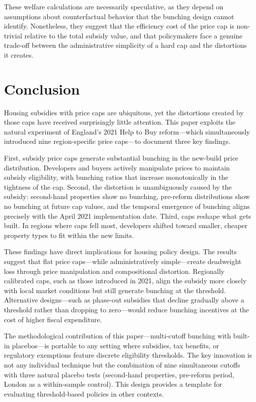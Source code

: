 \documentclass[12pt]{article}
\begin{document}
These welfare calculations are necessarily speculative, as they depend on assumptions about counterfactual behavior that the bunching design cannot identify. Nonetheless, they suggest that the efficiency cost of the price cap is non-trivial relative to the total subsidy value, and that policymakers face a genuine trade-off between the administrative simplicity of a hard cap and the distortions it creates.


\section{Conclusion}\label{sec:conclusion}

Housing subsidies with price caps are ubiquitous, yet the distortions created by those caps have received surprisingly little attention. This paper exploits the natural experiment of England's 2021 Help to Buy reform---which simultaneously introduced nine region-specific price caps---to document three key findings.

First, subsidy price caps generate substantial bunching in the new-build price distribution. Developers and buyers actively manipulate prices to maintain subsidy eligibility, with bunching ratios that increase monotonically in the tightness of the cap. Second, the distortion is unambiguously caused by the subsidy: second-hand properties show no bunching, pre-reform distributions show no bunching at future cap values, and the temporal emergence of bunching aligns precisely with the April 2021 implementation date. Third, caps reshape what gets built. In regions where caps fell most, developers shifted toward smaller, cheaper property types to fit within the new limits.

These findings have direct implications for housing policy design. The results suggest that flat price caps---while administratively simple---create deadweight loss through price manipulation and compositional distortion. Regionally calibrated caps, such as those introduced in 2021, align the subsidy more closely with local market conditions but still generate bunching at the threshold. Alternative designs---such as phase-out subsidies that decline gradually above a threshold rather than dropping to zero---would reduce bunching incentives at the cost of higher fiscal expenditure.

The methodological contribution of this paper---multi-cutoff bunching with built-in placebos---is portable to any setting where subsidies, tax benefits, or regulatory exemptions feature discrete eligibility thresholds. The key innovation is not any individual technique but the combination of nine simultaneous cutoffs with three natural placebo tests (second-hand properties, pre-reform period, London as a within-sample control). This design provides a template for evaluating threshold-based policies in other contexts.
\end{document}
